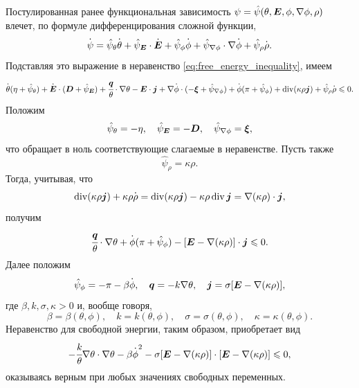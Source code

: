 Постулированная ранее функциональная зависимость $\psi = \hat{\psi}(\theta, {\boldsymbol{E}}, \phi, \nabla \phi, \rho)$ влечет, по формуле дифференцирования сложной функции,
\[
    \overset{\boldsymbol{.}}{\psi} = \hat{\psi}_\theta \overset{\boldsymbol{.}}{\theta} + \hat{\psi}_{\boldsymbol{E}} \cdot \overset{\boldsymbol{.}}{{\boldsymbol{E}}} + \hat{\psi}_\phi \overset{\boldsymbol{.}}{\phi} + \hat{\psi}_{\nabla \phi} \cdot \nabla \overset{\boldsymbol{.}}{\phi} + \hat{\psi}_\rho \overset{\boldsymbol{.}}{\rho}.
\]
Подставляя это выражение в неравенство \eqref{eq:free_energy_inequality}, имеем
\[
    \overset{\boldsymbol{.}}{\theta} (\eta + \hat{\psi}_\theta) + \overset{\boldsymbol{.}}{{\boldsymbol{E}}} \cdot ({\boldsymbol{D}} + \hat{\psi}_{\boldsymbol{E}}) + \cfrac{{\boldsymbol{q}}}{\theta} \cdot \nabla \theta - {\boldsymbol{E}} \cdot {\boldsymbol{j}} + \nabla \overset{\boldsymbol{.}}{\phi} \cdot (-{\boldsymbol{\xi}} + \hat{\psi}_{\nabla \phi}) + \overset{\boldsymbol{.}}{\phi}(\pi + \hat{\psi}_\phi) + \operatorname{{div}}(\kappa \rho {\boldsymbol{j}}) + \hat{\psi}_\rho \overset{\boldsymbol{.}}{\rho} \leqslant 0.
\]
Положим
\[
    \hat{\psi}_\theta = -\eta, \quad \hat{\psi}_{\boldsymbol{E}} = -{\boldsymbol{D}}, \quad \hat{\psi}_{\nabla \phi} = {\boldsymbol{\xi}},
\]
что обращает в ноль соответствующие слагаемые в неравенстве. Пусть также
\[
    \hat{\psi}_\rho = \kappa \rho.
\]
Тогда, учитывая, что
\[
    \operatorname{{div}}(\kappa \rho {\boldsymbol{j}}) + \kappa \rho \overset{\boldsymbol{.}}{\rho} = \operatorname{{div}}(\kappa \rho {\boldsymbol{j}}) - \kappa \rho \operatorname{{div}} {\boldsymbol{j}} = \nabla(\kappa \rho) \cdot {\boldsymbol{j}},
\]
получим
\[
    \cfrac{{\boldsymbol{q}}}{\theta} \cdot \nabla \theta + \overset{\boldsymbol{.}}{\phi}(\pi + \hat{\psi}_\phi) - [{\boldsymbol{E}} - \nabla(\kappa \rho)] \cdot {\boldsymbol{j}} \leqslant 0.
\]
Далее положим
\[
    \hat{\psi}_\phi = -\pi - \beta \overset{\boldsymbol{.}}{\phi}, \quad {\boldsymbol{q}} = -k \nabla \theta, \quad {\boldsymbol{j}} = \sigma [{\boldsymbol{E}} - \nabla (\kappa \rho)],
\]
где $\beta, k, \sigma, \kappa > 0$ и, вообще говоря,
\[
    \beta = \beta(\theta, \phi), \quad k = k(\theta, \phi), \quad \sigma = \sigma(\theta, \phi), \quad \kappa = \kappa(\theta, \phi).
\]
Неравенство для свободной энергии, таким образом, приобретает вид
\[
    -\cfrac{k}{\theta} \nabla \theta \cdot \nabla \theta - \beta \overset{\boldsymbol{.}}{\phi}^2 - \sigma [{\boldsymbol{E}} - \nabla(\kappa \rho)] \cdot [{\boldsymbol{E}} - \nabla(\kappa \rho)] \leqslant 0,
\]
оказываясь верным при любых значениях свободных переменных.


